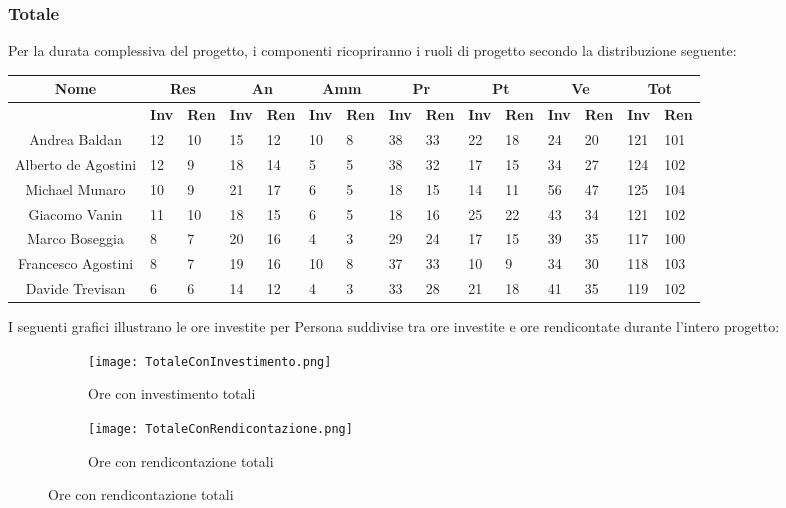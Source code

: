 \documentclass{scalatekids-article}
\begin{document}
\subsubsection{Totale}
Per la durata complessiva del progetto, i componenti ricopriranno i ruoli di progetto secondo la distribuzione seguente:
\begin{center}
  \scriptsize
  \begin{tabular}{| c | p{0.35cm}  p{0.35cm} | p{0.35cm}  p{0.35cm} | p{0.35cm}  p{0.35cm} | p{0.35cm}  p{0.35cm} | p{0.35cm}  p{0.35cm} | p{0.35cm}  p{0.35cm} | p{0.35cm}  p{0.35cm} |}
    \hline
    \textbf{Nome} & \multicolumn{2}{|c|}{\textbf{Res}} & \multicolumn{2}{|c|}{\textbf{An}} & \multicolumn{2}{|c|}{\textbf{Amm}} & \multicolumn{2}{|c|}{\textbf{Pr}} & \multicolumn{2}{|c|}{\textbf{Pt}} & \multicolumn{2}{|c|}{\textbf{Ve}} & \multicolumn{2}{|c|}{\textbf{Tot}}\\
    \hline
    & \textbf{Inv} & \textbf{Ren} & \textbf{Inv} & \textbf{Ren} & \textbf{Inv} & \textbf{Ren} & \textbf{Inv} & \textbf{Ren} & \textbf{Inv} & \textbf{Ren} & \textbf{Inv} & \textbf{Ren} & \textbf{Inv} & \textbf{Ren}\\
    \hline
    Andrea Baldan & 12 & 10 & 15 & 12 & 10 & 8 & 38 & 33 & 22 & 18 & 24 & 20 & 121 & 101\\
    Alberto de Agostini & 12 & 9 & 18 & 14 & 5 & 5 & 38 & 32 & 17 & 15 & 34 & 27 & 124 & 102\\
    Michael Munaro & 10 & 9 & 21 & 17 & 6 & 5 & 18 & 15 & 14 & 11 & 56 & 47 & 125 & 104\\
    Giacomo Vanin & 11 & 10 & 18 & 15 & 6 & 5 & 18 & 16 & 25 & 22 & 43 & 34 & 121 & 102\\
    Marco Boseggia & 8 & 7 & 20 & 16 & 4 & 3 & 29 & 24 & 17 & 15 & 39 & 35 & 117 & 100\\
    Francesco Agostini & 8 & 7 & 19 & 16 & 10 & 8 & 37 & 33 & 10 & 9 & 34 & 30 & 118 & 103\\
    Davide Trevisan & 6 & 6 & 14 & 12 & 4 & 3 & 33 & 28 & 21 & 18 & 41 & 35 & 119 & 102\\
    \hline
  \end{tabular}
\end{center}
\normalsize
I seguenti grafici illustrano le ore investite per Persona suddivise tra ore investite e ore rendicontate durante l'intero progetto:
\begin{figure}[H]
  \begin{subfigure}[H]{0.47\textwidth}
    \texttt{[image: TotaleConInvestimento.png]}
    \caption{Ore con investimento totali}
  \end{subfigure}
  \qquad
  \begin{subfigure}[H]{0.47\textwidth}
    \texttt{[image: TotaleConRendicontazione.png]}
    \caption{Ore con rendicontazione totali}
  \end{subfigure}
\end{figure}
\end{document}
